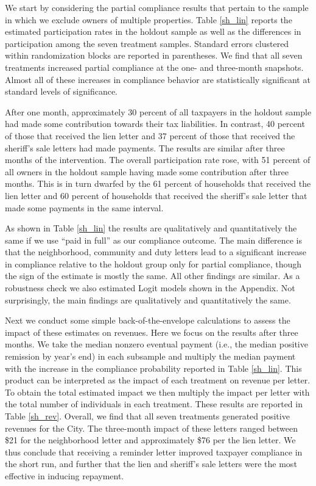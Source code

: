 \documentclass[12pt]{article}
\begin{document}
We start by considering the partial compliance results that pertain to
the sample in which we exclude owners of multiple properties.  Table
\ref{sh_lin} reports the estimated participation rates in the holdout
sample as well as the differences in participation among the seven
treatment samples. Standard errors clustered within randomization
blocks are reported in parentheses. We
find that all seven treatments increased partial compliance at the
one- and three-month snapshots. Almost all of these increases in
compliance behavior are statistically significant at standard levels
of significance.

After one month, approximately 30 percent of all taxpayers in the
holdout sample had made some contribution towards their tax
liabilities. In contrast, 40 percent of those that received the lien
letter and 37 percent of those that received the sheriff's sale
letters had made payments. The results are similar after three months
of the intervention.  The overall participation rate rose, with 51
percent of all owners in the holdout sample having made some
contribution after three months.  This is in turn dwarfed by the 61
percent of households that received the lien letter and 60 percent of
households that received the sheriff's sale letter that made some
payments in the same interval.

As shown in Table \ref{sh_lin} the results are qualitatively and
quantitatively the same if we use ``paid in full'' as our compliance
outcome. The main difference is that the neighborhood, community and
duty letters lead to a significant increase in compliance relative to
the holdout group only for partial compliance, though the sign of the
estimate is mostly the same. All other findings are similar. As a
robustness check we also estimated Logit models shown in the Appendix.
Not surprisingly, the main findings are qualitatively and quantitatively 
the same.

Next we conduct some simple back-of-the-envelope calculations to
assess the impact of these estimates on revenues. Here we focus on the
results after three months. We take the median nonzero eventual
payment (i.e., the median positive remission by year's end) in each
subsample and multiply the median payment with the increase in the
compliance probability reported in Table \ref{sh_lin}. This product
can be interpreted as the impact of each treatment on revenue per
letter. To obtain the total estimated impact we then multiply the
impact per letter with the total number of individuals in each
treatment. These results are reported in Table \ref{sh_rev}.  Overall,
we find that all seven treatments generated positive revenues for the
City.  The three-month impact of these letters ranged between \$21 for
the neighborhood letter and approximately \$76 per the lien letter. We
thus conclude that receiving a reminder letter improved taxpayer
compliance in the short run, and further that the lien and sheriff's
sale letters were the most effective in inducing repayment.
\end{document}
